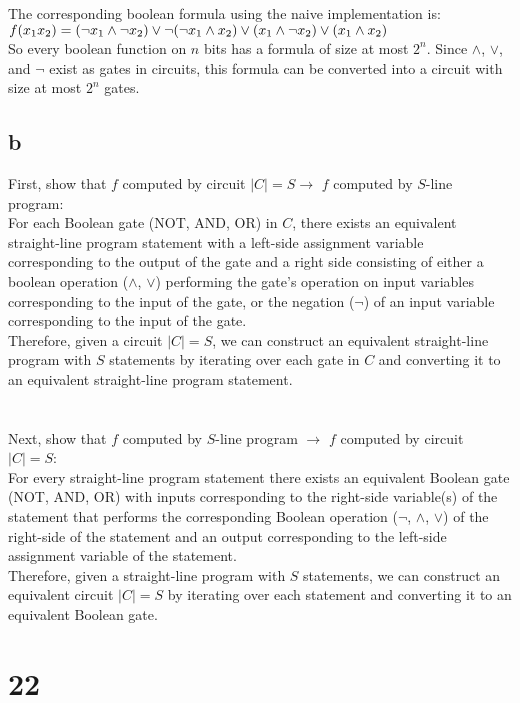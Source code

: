 \documentclass[letterpaper,notitlepage,twoside]{article}
\begin{document}
The corresponding boolean formula using the naive implementation is:
$f(x_1x_2) = (\neg x_1 \land \neg x_2) \lor \\
\neg(\neg x_1 \land x_2) \lor \\
(x_1 \land \neg x_2) \lor \\
(x_1 \land x_2)$ \\

So every boolean function on $n$ bits has a formula of size at most $2^n$.
Since $\land$, $\lor$, and $\neg$ exist as gates in circuits, this formula can be converted into a circuit with size at most $2^n$ gates.

\subsection*{b}
First, show that $f$ computed by circuit $|C| = S \rightarrow$ $f$ computed by $S$-line program: \\
For each Boolean gate (NOT, AND, OR) in $C$, there exists an equivalent straight-line program statement with a left-side assignment variable corresponding to the output of the gate and a right side consisting of either a boolean operation ($\land$, $\lor$) performing the gate's operation on input variables corresponding to the input of the gate, or the negation ($\neg$) of an input variable corresponding to the input of the gate. \\
Therefore, given a circuit $|C| = S$, we can construct an equivalent straight-line program with $S$ statements by iterating over each gate in $C$ and converting it to an equivalent straight-line program statement. \\ \\ \\
Next, show that $f$ computed by $S$-line program $\rightarrow$ $f$ computed by circuit $|C| = S$: \\
For every straight-line program statement there exists an equivalent Boolean gate (NOT, AND, OR) with inputs corresponding to the right-side variable(s) of the statement that performs the corresponding Boolean operation ($\neg$, $\land$, $\lor$) of the right-side of the statement and an output corresponding to the left-side assignment variable of the statement. \\
Therefore, given a straight-line program with $S$ statements, we can construct an equivalent circuit $|C| = S$ by iterating over each statement and converting it to an equivalent Boolean gate. \\

\section*{22}
\end{document}
